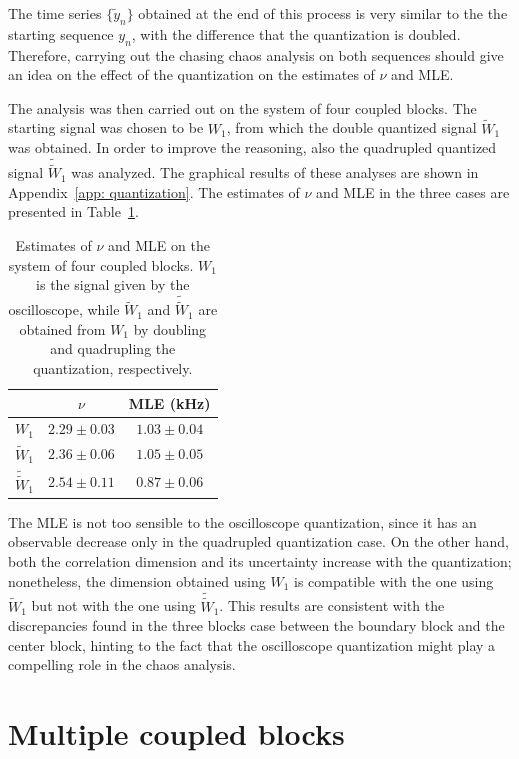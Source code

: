 The time series $\{\tilde{y}_n\}$ obtained at the end of this process is very similar to the
the starting sequence $y_n$, with the difference that the quantization is doubled.
Therefore, carrying out the chasing chaos analysis on both sequences should give an idea on the
effect of the quantization on the estimates of $\nu$ and MLE\@.

The analysis was then carried out on the system of four coupled blocks.
The starting signal was chosen to be $W_1$, from which the double quantized signal $\tilde{W}_1$
was obtained. In order to improve the reasoning, also the quadrupled quantized signal $\tilde{\tilde{W}}_1$
was analyzed. The graphical results of these analyses are shown in Appendix~\ref{app: quantization}.
The estimates of $\nu$ and MLE in the three cases are presented in Table~\ref{tab: quantization}.

\begin{table}[ht!]
    \centering
    \begin{tabular}{c|c|c}
                    & $\nu$         & MLE (kHz)     \\ \hline
        $W_1$       & $2.29\pm0.03$   & $1.03\pm0.04$ \\ \hline
        $\tilde{W}_1$ & $2.36\pm0.06$   & $1.05\pm0.05$ \\ \hline
        $\tilde{\tilde{W}}_1$ & $2.54\pm0.11$ & $0.87\pm0.06$
    \end{tabular}
    \caption{Estimates of $\nu$ and MLE on the system of four coupled blocks.
    $W_1$ is the signal given by the oscilloscope, while $\tilde{W}_1$ and $\tilde{\tilde{W}}_1$ are
    obtained from $W_1$ by doubling and quadrupling the quantization, respectively.
    }\label{tab: quantization}
\end{table}

The MLE is not too sensible to the oscilloscope quantization, since it has an observable decrease
only in the quadrupled quantization case. On the other hand, both the correlation dimension and
its uncertainty increase with the quantization; nonetheless, the dimension obtained using $W_1$ is
compatible with the one using $\tilde{W}_1$ but not with the one using $\tilde{\tilde{W}}_1$.
This results are consistent with the discrepancies found in the three blocks case between
the boundary block and the center block, hinting to the fact that the oscilloscope quantization
might play a compelling role in the chaos analysis.


\section{Multiple coupled blocks}\label{sec: many blocks chaos}

